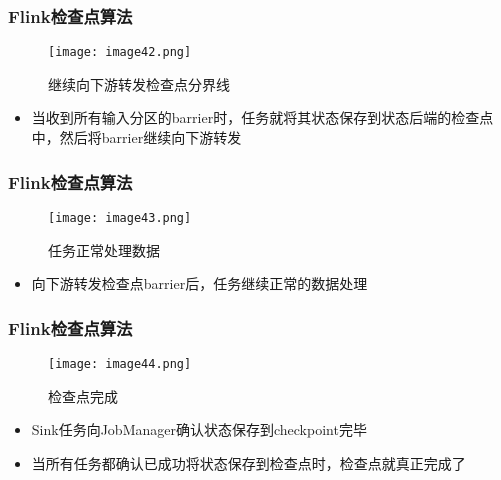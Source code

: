 \documentclass{beamer}
\begin{document}
  \begin{frame}
      \frametitle{Flink检查点算法}

      \begin{figure}
        \centering
        \texttt{[image: image42.png]}
        \caption{继续向下游转发检查点分界线}
      \end{figure}
  
      \begin{itemize}
          \item 当收到所有输入分区的barrier时，任务就将其状态保存到状态后端的检查点中，然后将barrier继续向下游转发
      \end{itemize}
  
  \end{frame}

  \begin{frame}
      \frametitle{Flink检查点算法}

      \begin{figure}
        \centering
        \texttt{[image: image43.png]}
        \caption{任务正常处理数据}
      \end{figure}
  
      \begin{itemize}
          \item 向下游转发检查点barrier后，任务继续正常的数据处理
      \end{itemize}
  
  \end{frame}

  \begin{frame}
      \frametitle{Flink检查点算法}

      \begin{figure}
        \centering
        \texttt{[image: image44.png]}
        \caption{检查点完成}
      \end{figure}
  
      \begin{itemize}
          \item Sink任务向JobManager确认状态保存到checkpoint完毕
          \item 当所有任务都确认已成功将状态保存到检查点时，检查点就真正完成了
      \end{itemize}
  
  \end{frame}
\end{document}
